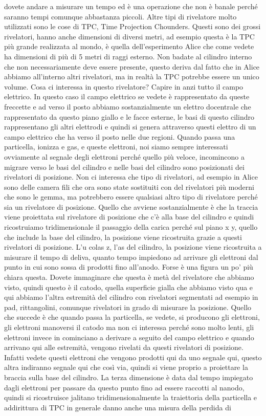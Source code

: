 dovete andare a misurare un tempo ed è una operazione che non è banale perché saranno tempi comunque abbastanza piccoli. Altre tipi di rivelatore molto utilizzati sono le cose di TPC, Time Projection Chounders. Questi sono dei grossi rivelatori, hanno anche dimensioni di diversi metri, ad esempio questa è la TPC più grande realizzata al mondo, è quella dell'esperimento Alice che come vedete ha dimensioni di più di 5 metri di raggi esterno. Non badate al cilindro interno che non necessariamente deve essere presente, questo deriva dal fatto che in Alice abbiamo all'interno altri rivelatori, ma in realtà la TPC potrebbe essere un unico volume. Cosa ci interessa in questo rivelatore? Capire in anzi tutto il campo elettrico. In questo caso il campo elettrico se vedete è rappresentato da queste freccette e ad verso il posto abbiamo sostanzialmente un elettro docentrale che rappresentato da questo piano giallo e le facce esterne, le basi di questo cilindro rappresentano gli altri elettrodi e quindi si genera attraverso questi elettro di un campo elettrico che ha verso il posto nelle due regioni. Quando passa una particella, ionizza e gas, e queste elettroni, noi siamo sempre interessati ovviamente al segnale degli elettroni perché quello più veloce, incomincono a migrare verso le basi del cilindro e nelle basi del cilindro sono posizionati dei rivelatori di posizione. Non ci interessa che tipo di rivelatori, ad esempio in Alice sono delle camera fili che ora sono state sostituiti con del rivelatori più moderni che sono le gemma, ma potrebbero essere qualsiasi altro tipo di rivelatore perché sia un rivelatore di posizione. Quello che avviene sostanzialmente è che la traccia viene proiettata sul rivelatore di posizione che c'è alla base del cilindro e quindi ricostruiamo tridimensionale il passaggio della carica perché sul piano x y, quello che include la base del cilindro, la posizione viene ricostruita grazie a questi rivelatori di posizione. L'u colas z, l'as del cilindro, la posizione viene ricostruita a misurare il tempo di deliva, quanto tempo impiedono ad arrivare gli elettroni dal punto in cui sono sossa di prodotti fino all'anodo. Forse è una figura un po' più chiara questa. Dovete immaginare che questa è metà del rivelatore che abbiamo visto, quindi questo è il catodo, quella superficie gialla che abbiamo visto qua e qui abbiamo l'altra estremità del cilindro con rivelatori segmentati ad esempio in pad, rittangolini, comunque rivelatori in grado di misurare la posizione. Quello che succede è che quando passa la particella, se vedete, si producono gli elettroni, gli elettroni manoversi il catodo ma non ci interessa perché sono molto lenti, gli elettroni invece in cominciano a derivare a seguito del campo elettrico e quando arrivano qui alle estremità, vengono rivelati da questi rivelatori di posizione. Infatti vedete questi elettroni che vengono prodotti qui da uno segnale qui, questo altra indiranno segnale qui che così via, quindi si viene proprio a proiettare la braccia sulla base del cilindro. La terza dimensione è data dal tempo impiegato dagli elettroni per passare da questo punto fino ad essere raccotti al nanodo, quindi si ricostruisce jalitano tridimensionalmente la traiettoria della particella e addirittura di TPC in generale danno anche una misura della perdida di 